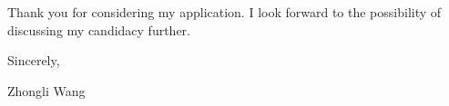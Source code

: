 \documentclass{nfr}
\begin{document}
Thank you for considering my application. I look forward to the possibility of discussing my candidacy further.\\
\vspace{10mm}

\noindent Sincerely,\\
\vspace{19mm}

\noindent Zhongli Wang

\vspace{10mm}




\end{document}
